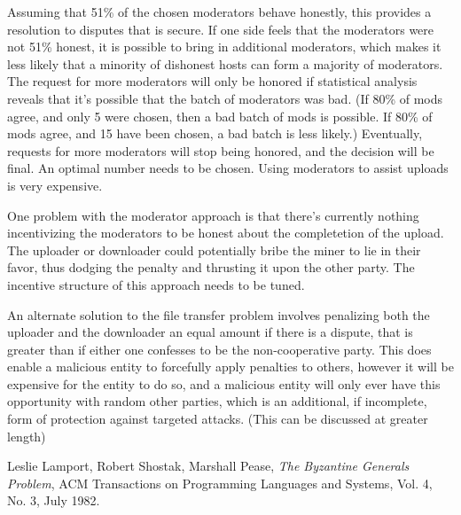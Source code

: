 \documentclass[twocolumn]{article}
\begin{document}
\begin{appendices}
Assuming that 51\% of the chosen moderators behave honestly, this provides a resolution to disputes that is secure.
If one side feels that the moderators were not 51\% honest, it is possible to bring in additional moderators, which makes it less likely that a minority of dishonest hosts can form a majority of moderators.
The request for more moderators will only be honored if statistical analysis reveals that it's possible that the batch of moderators was bad. (If 80\% of mods agree, and only 5 were chosen, then a bad batch of mods is possible. If 80\% of mods agree, and 15 have been chosen, a bad batch is less likely.)
Eventually, requests for more moderators will stop being honored, and the decision will be final.
An optimal number needs to be chosen.
Using moderators to assist uploads is very expensive.

One problem with the moderator approach is that there's currently nothing incentivizing the moderators to be honest about the completetion of the upload.
The uploader or downloader could potentially bribe the miner to lie in their favor, thus dodging the penalty and thrusting it upon the other party.
The incentive structure of this approach needs to be tuned.

An alternate solution to the file transfer problem involves penalizing both the uploader and the downloader an equal amount if there is a dispute, that is greater than if either one confesses to be the non-cooperative party.
This does enable a malicious entity to forcefully apply penalties to others, however it will be expensive for the entity to do so, and a malicious entity will only ever have this opportunity with random other parties, which is an additional, if incomplete, form of protection against targeted attacks.
(This can be discussed at greater length)

\end{appendices}

\begin{thebibliography}{1}

	Leslie Lamport, Robert Shostak, Marshall Pease,
	\emph{The Byzantine Generals Problem},
	ACM Transactions on Programming Languages and Systems, Vol. 4, No. 3, July 1982.

\end{thebibliography}
\end{document}
